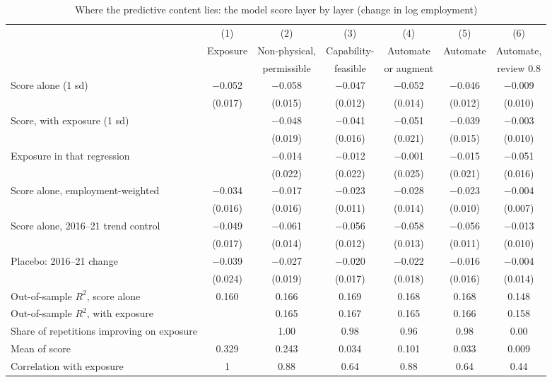 \begin{table}[tbp]
\centering
\caption{Where the predictive content lies: the model score layer by layer (change in log employment)}\label{tab:backtest-decomp}
\footnotesize
\setlength{\tabcolsep}{4pt}
\begin{tabular}{@{}lcccccc@{}}
\toprule
 & (1) & (2) & (3) & (4) & (5) & (6)\\
 & Exposure & Non-physical, & Capability- & Automate & Automate & Automate,\\
 & & permissible & feasible & or augment & & review 0.8\\
\midrule
Score alone (1 sd) & $-$0.052 & $-$0.058 & $-$0.047 & $-$0.052 & $-$0.046 & $-$0.009\\
 & (0.017) & (0.015) & (0.012) & (0.014) & (0.012) & (0.010)\\
Score, with exposure (1 sd) &  & $-$0.048 & $-$0.041 & $-$0.051 & $-$0.039 & $-$0.003\\
 &  & (0.019) & (0.016) & (0.021) & (0.015) & (0.010)\\
Exposure in that regression &  & $-$0.014 & $-$0.012 & $-$0.001 & $-$0.015 & $-$0.051\\
 &  & (0.022) & (0.022) & (0.025) & (0.021) & (0.016)\\
Score alone, employment-weighted & $-$0.034 & $-$0.017 & $-$0.023 & $-$0.028 & $-$0.023 & $-$0.004\\
 & (0.016) & (0.016) & (0.011) & (0.014) & (0.010) & (0.007)\\
Score alone, 2016--21 trend control & $-$0.049 & $-$0.061 & $-$0.056 & $-$0.058 & $-$0.056 & $-$0.013\\
 & (0.017) & (0.014) & (0.012) & (0.013) & (0.011) & (0.010)\\
Placebo: 2016--21 change & $-$0.039 & $-$0.027 & $-$0.020 & $-$0.022 & $-$0.016 & $-$0.004\\
 & (0.024) & (0.019) & (0.017) & (0.018) & (0.016) & (0.014)\\
\addlinespace
Out-of-sample $R^2$, score alone & 0.160 & 0.166 & 0.169 & 0.168 & 0.168 & 0.148\\
Out-of-sample $R^2$, with exposure & & 0.165 & 0.167 & 0.165 & 0.166 & 0.158\\
Share of repetitions improving on exposure & & 1.00 & 0.98 & 0.96 & 0.98 & 0.00\\
Mean of score & 0.329 & 0.243 & 0.034 & 0.101 & 0.033 & 0.009\\
Correlation with exposure & 1 & 0.88 & 0.64 & 0.88 & 0.64 & 0.44\\

\end{tabular}
\end{table}
